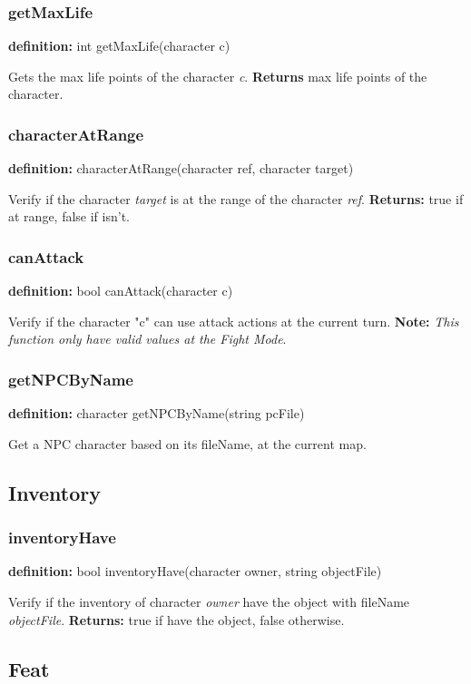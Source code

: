 \documentclass[ letterpaper,12pt]{article}
\begin{document}
\subsubsection{getMaxLife}
{\bf definition:} int getMaxLife(character c)

Gets the max life points of the character {\it c}. {\bf Returns} max
life points of the character.

\subsubsection{characterAtRange}
{\bf definition:} characterAtRange(character ref, character target)

Verify if the character {\it target} is at the range of the character {\it ref}.
{\bf Returns:} true if at range, false if isn't.

\subsubsection{canAttack}
{\bf definition:} bool canAttack(character c)

Verify if the character "c" can use attack actions at the current turn.
{\bf Note:} {\it This function only have valid values at the Fight Mode}.

\subsubsection{getNPCByName}
{\bf definition:} character getNPCByName(string pcFile)

Get a NPC character based on its fileName, at the current map.

\subsection{Inventory}

\subsubsection{inventoryHave}
{\bf definition:} bool inventoryHave(character owner, string objectFile)

Verify if the inventory of character {\it owner} have the object with fileName
{\it objectFile}. {\bf Returns: } true if have the object, false otherwise.

\subsection{Feat}
\end{document}
